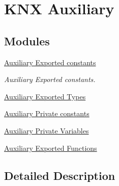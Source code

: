 \hypertarget{group___k_n_x___aux}{}\section{K\+NX Auxiliary}
\label{group___k_n_x___aux}
\subsection*{Modules}
\begin{DoxyCompactItemize}
\item 
\hyperlink{group___k_n_x___aux___exported___consts}{Auxiliary Exported constants}
\begin{DoxyCompactList}\small\item\em Auxiliary Exported constants. \end{DoxyCompactList}\item 
\hyperlink{group___k_n_x___aux___exported___types}{Auxiliary Exported Types}
\item 
\hyperlink{group___k_n_x___aux___private___consts}{Auxiliary Private constants}
\item 
\hyperlink{group___k_n_x___aux___private___variables}{Auxiliary Private Variables}
\item 
\hyperlink{group___k_n_x___aux___exported___functions}{Auxiliary Exported Functions}
\end{DoxyCompactItemize}


\subsection{Detailed Description}
